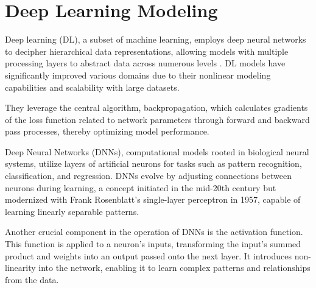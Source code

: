 \section{Deep Learning Modeling}

Deep learning (DL), a subset of machine learning, employs deep neural networks to decipher hierarchical data representations, allowing models with multiple processing layers to abstract data across numerous levels \cite{LeCun2015DeepLearning}. DL models have significantly improved various domains due to their nonlinear modeling capabilities and scalability with large datasets.

They leverage the central algorithm, backpropagation, which calculates gradients of the loss function related to network parameters through forward and backward pass processes, thereby optimizing model performance.



Deep Neural Networks (DNNs), computational models rooted in biological neural systems, utilize layers of artificial neurons for tasks such as pattern recognition, classification, and regression. DNNs evolve by adjusting connections between neurons during learning, a concept initiated in the mid-20th century but modernized with Frank Rosenblatt's single-layer perceptron in 1957, capable of learning linearly separable patterns.



Another crucial component in the operation of DNNs is the activation function. This function is applied to a neuron's inputs, transforming the input's summed product and weights into an output passed onto the next layer. It introduces non-linearity into the network, enabling it to learn complex patterns and relationships from the data.



\newpage